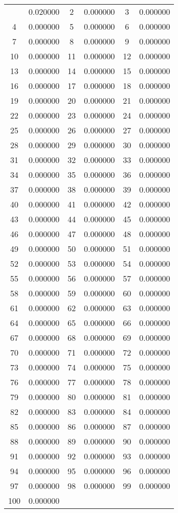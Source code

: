 \documentclass[12pt]{article}
\begin{document}
\begin{longtable}{@{}cc|cc|cc@{}}
\bottomrule
\endlastfoot
1 & 0.020000 & 2 & 0.000000 & 3 & 0.000000 \\
4 & 0.000000 & 5 & 0.000000 & 6 & 0.000000 \\
7 & 0.000000 & 8 & 0.000000 & 9 & 0.000000 \\
10 & 0.000000 & 11 & 0.000000 & 12 & 0.000000 \\
13 & 0.000000 & 14 & 0.000000 & 15 & 0.000000 \\
16 & 0.000000 & 17 & 0.000000 & 18 & 0.000000 \\
19 & 0.000000 & 20 & 0.000000 & 21 & 0.000000 \\
22 & 0.000000 & 23 & 0.000000 & 24 & 0.000000 \\
25 & 0.000000 & 26 & 0.000000 & 27 & 0.000000 \\
28 & 0.000000 & 29 & 0.000000 & 30 & 0.000000 \\
31 & 0.000000 & 32 & 0.000000 & 33 & 0.000000 \\
34 & 0.000000 & 35 & 0.000000 & 36 & 0.000000 \\
37 & 0.000000 & 38 & 0.000000 & 39 & 0.000000 \\
40 & 0.000000 & 41 & 0.000000 & 42 & 0.000000 \\
43 & 0.000000 & 44 & 0.000000 & 45 & 0.000000 \\
46 & 0.000000 & 47 & 0.000000 & 48 & 0.000000 \\
49 & 0.000000 & 50 & 0.000000 & 51 & 0.000000 \\
52 & 0.000000 & 53 & 0.000000 & 54 & 0.000000 \\
55 & 0.000000 & 56 & 0.000000 & 57 & 0.000000 \\
58 & 0.000000 & 59 & 0.000000 & 60 & 0.000000 \\
61 & 0.000000 & 62 & 0.000000 & 63 & 0.000000 \\
64 & 0.000000 & 65 & 0.000000 & 66 & 0.000000 \\
67 & 0.000000 & 68 & 0.000000 & 69 & 0.000000 \\
70 & 0.000000 & 71 & 0.000000 & 72 & 0.000000 \\
73 & 0.000000 & 74 & 0.000000 & 75 & 0.000000 \\
76 & 0.000000 & 77 & 0.000000 & 78 & 0.000000 \\
79 & 0.000000 & 80 & 0.000000 & 81 & 0.000000 \\
82 & 0.000000 & 83 & 0.000000 & 84 & 0.000000 \\
85 & 0.000000 & 86 & 0.000000 & 87 & 0.000000 \\
88 & 0.000000 & 89 & 0.000000 & 90 & 0.000000 \\
91 & 0.000000 & 92 & 0.000000 & 93 & 0.000000 \\
94 & 0.000000 & 95 & 0.000000 & 96 & 0.000000 \\
97 & 0.000000 & 98 & 0.000000 & 99 & 0.000000 \\
100 & 0.000000 &  &  &  &  \\

\end{longtable}
\end{document}

